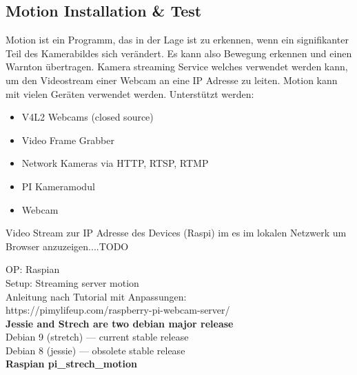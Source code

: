 
\subsection{Motion Installation \& Test}

Motion ist ein Programm, das in der Lage ist zu erkennen, wenn ein signifikanter Teil des Kamerabildes sich verändert. Es kann also 
Bewegung erkennen und einen Warnton übertragen. Kamera streaming 
Service welches verwendet werden kann, um den Videostream 
einer Webcam an eine IP Adresse zu leiten. Motion kann mit 
vielen Geräten verwendet werden. Unterstützt werden:
\begin{itemize}
\item V4L2 Webcams (closed source)
\item Video Frame Grabber
\item Network Kameras via HTTP, RTSP, RTMP
\item PI Kameramodul
\item Webcam
\end{itemize}

Video Stream zur IP Adresse des Devices (Raspi) im es im lokalen 
Netzwerk um Browser anzuzeigen....TODO

OP: Raspian\\
Setup: Streaming server motion\\

Anleitung nach Tutorial mit Anpassungen:\\
https://pimylifeup.com/raspberry-pi-webcam-server/\\

\textbf{Jessie and Strech are two debian major release}\\
Debian 9 (stretch) — current stable release\\
Debian 8 (jessie) — obsolete stable release\\

\textbf{Raspian pi\_strech\_motion}

